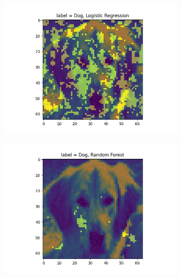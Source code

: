 \documentclass{article}
\begin{document}
\begin{figure}[H]
\begin{subfigure}{.33\textwidth}
  \centering
  \includegraphics[width=1\linewidth]{2c/Imp feat LR.png}  
  
  \label{fig:sub-first}
\end{subfigure}
\begin{subfigure}{.33\textwidth}
  \centering
  \includegraphics[width=1\linewidth]{2c/Imp feat RF.png}  
  

\end{subfigure}
\end{figure}
\end{document}
